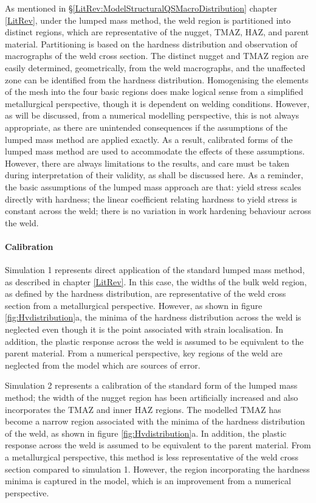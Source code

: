 As mentioned in \S\ref{LitRev:ModelStructuralQSMacroDistribution} chapter \ref{LitRev}, under the lumped mass method, the weld region is partitioned into distinct regions, which are representative of the nugget, TMAZ, HAZ, and parent material. Partitioning is based on the hardness distribution and observation of macrographs of the weld cross section. The distinct nugget and TMAZ region are easily determined, geometrically, from the weld macrographs, and the unaffected zone can be identified from the hardness distribution. Homogenising the elements of the mesh into the four basic regions does make logical sense from a simplified metallurgical perspective, though it is dependent on welding conditions. However, as will be discussed, from a numerical modelling perspective, this is not always appropriate, as there are unintended consequences if the assumptions of the lumped mass method are applied exactly. As a result, calibrated forms of the lumped mass method are used to accommodate the effects of these assumptions. However, there are always limitations to the results, and care must be taken during interpretation of their validity, as shall be discussed here. As a reminder, the basic assumptions of the lumped mass approach are that: yield stress scales directly with hardness; the linear coefficient relating hardness to yield stress is constant across the weld; there is no variation in work hardening behaviour across the weld.

\paragraph{Calibration}
\label{SMDModellingstudyResultsSims1to4Correction1Calibration}
Simulation 1 represents direct application of the standard lumped mass method, as described in chapter \ref{LitRev}. In this case, the widths of the bulk weld region, as defined by the hardness distribution, are representative of the weld cross section from a metallurgical perspective. However, as shown in figure \ref{fig:Hvdistribution}a, the minima of the hardness distribution across the weld is neglected even though it is the point associated with strain localisation. In addition, the plastic response across the weld is assumed to be equivalent to the parent material. From a numerical perspective, key regions of the weld are neglected from the model which are sources of error.

Simulation 2 represents a calibration of the standard form of the lumped mass method; the width of the nugget region has been artificially increased and also incorporates the TMAZ and inner HAZ regions. The modelled TMAZ has become a narrow region associated with the minima of the hardness distribution of the weld, as shown in figure \ref{fig:Hvdistribution}a. In addition, the plastic response across the weld is assumed to be equivalent to the parent material. From a metallurgical perspective, this method is less representative of the weld cross section compared to simulation 1. However, the region incorporating the hardness minima is captured in the model, which is an improvement from a numerical perspective. 

